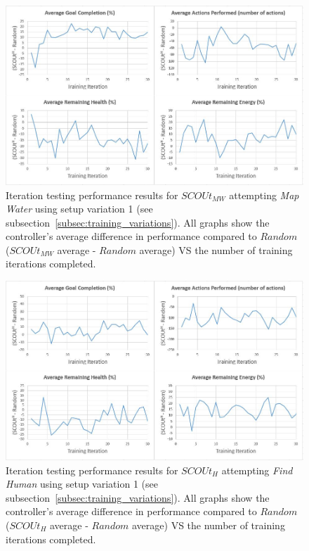 \begin{appx}
\begin{figure}[H]
  \includegraphics[width=0.9\columnwidth]{Figures/Results/TrainingVariation1/MapWater.JPG}
  \caption{Iteration testing performance results for $SCOUt_{MW}$ attempting \textit{Map Water} using setup variation 1 (see subsection~\ref{subsec:training_variations}). All graphs show the controller's average difference in performance compared to $Random$ ($SCOUt_{MW}$ average - $Random$ average) VS the number of training iterations completed.}
  \label{appendix:mapwater_training_variation1}
\end{figure}
\end{appx}


\begin{appx}
\begin{figure}[H]
  \includegraphics[width=0.9\columnwidth]{Figures/Results/TrainingVariation1/Hybrid-FindHuman.JPG}
  \caption{Iteration testing performance results for $SCOUt_{H}$ attempting \textit{Find Human} using setup variation 1 (see subsection~\ref{subsec:training_variations}). All graphs show the controller's average difference in performance compared to $Random$ ($SCOUt_{H}$ average - $Random$ average) VS the number of training iterations completed.}
  \label{appendix:hybrid_training_fh_variation1}
\end{figure}
\end{appx}


